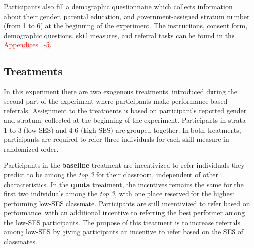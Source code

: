 \documentclass[11pt,a4paper,oneside]{article}
\begin{document}
Participants also fill a demographic questionnaire which collects information about their gender, parental education, and government-assigned stratum number (from 1 to 6) at the beginning of the experiment. The instructions, consent form, demographic questions, skill measures, and referral tasks can be found in the \textcolor{red}{Appendices 1-5}.   

\subsection{Treatments} \label{Treatments}


In this experiment there are two exogenous treatments, introduced during the second part of the experiment where participants make performance-based referrals. Assignment to the treatments is based on participant's reported gender and stratum, collected at the beginning of the experiment. Participants in strata 1 to 3 (low SES) and 4-6 (high SES) are grouped together. In both treatments, participants are required to refer three individuals for each skill measure in randomized order. 

Participants in the \textbf{baseline} treatment are incentivized to refer individuals they predict to be among the \textit{top 3} for their classroom, independent of other characteristics. In the \textbf{quota} treatment, the incentives remains the same for the first two individuals among the \textit{top 3}, with one place reserved for the highest performing low-SES classmate. Participants are still incentivized to refer based on performance, with an additional incentive to  referring the best performer among the low-SES participants. The purpose of this treatment is to increase referrals among low-SES by giving participants an incentive to refer based on the SES of classmates. 
\end{document}
